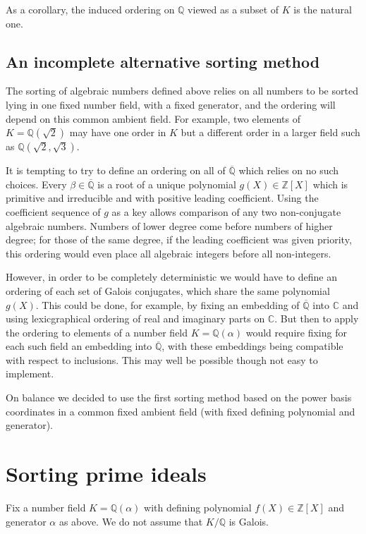 \documentclass{article}
\def\Z{{\mathbb Z}}
\def\Q{{\mathbb Q}}
\def\C{{\mathbb C}}
\def\Qbar{\overline{\Q}}
\begin{document}
As a corollary, the induced ordering on $\Q$ viewed as a subset of $K$
is the natural one.

\subsection{An incomplete alternative sorting method}

The sorting of algebraic numbers defined above relies on all numbers
to be sorted lying in one fixed number field, with a fixed generator,
and the ordering will depend on this common ambient field.  For
example, two elements of $K=\Q(\sqrt{2})$ may have one order in $K$
but a different order in a larger field such as
$\Q(\sqrt{2},\sqrt{3})$.

It is tempting to try to define an ordering on all of $\Qbar$ which
relies on no such choices.  Every $\beta\in\Qbar$ is a root of a
unique polynomial $g(X)\in\Z[X]$ which is primitive and irreducible
and with positive leading coefficient.  Using the coefficient sequence
of $g$ as a key allows comparison of any two non-conjugate algebraic
numbers.  Numbers of lower degree come before numbers of higher
degree; for those of the same degree, if the leading coefficient was
given priority, this ordering would even place all algebraic integers
before all non-integers.

However, in order to be completely deterministic we would have to
define an ordering of each set of Galois conjugates, which share the
same polynomial $g(X)$.  This could be done, for example, by fixing an
embedding of $\Qbar$ into $\C$ and using lexicgraphical ordering of
real and imaginary parts on $\C$.  But then to apply the ordering to
elements of a number field $K=\Q(\alpha)$ would require fixing for
each such field an embedding into $\Qbar$, with these embeddings being
compatible with respect to inclusions.  This may well be possible
though not easy to implement.

On balance we decided to use the first sorting method based on the
power basis coordinates in a common fixed ambient field (with fixed
defining polynomial and generator).

\section{Sorting prime ideals}\label{sec:primes}
Fix a number field $K=\Q(\alpha)$ with defining polynomial
$f(X)\in\Z[X]$ and generator $\alpha$ as above.  We do not assume that
$K/\Q$ is Galois.
\end{document}

